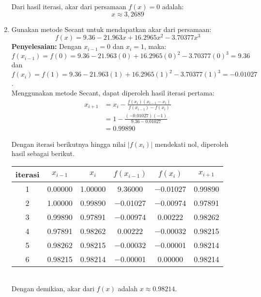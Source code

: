 \documentclass{article}
\newcommand{\penyelesaian}{\textbf{Penyelesaian: }}
\begin{document}
\begin{enumerate}
    Dari hasil iterasi, akar dari persamaan $f(x) = 0$ adalah:
    \begin{equation}
        x \approx 3,2689
    \end{equation}

    \item Gunakan metode Secant untuk mendapatkan akar dari persamaan:
    \begin{equation*}
        f(x) = \num{9,36} - \num{21,963}x + \num{16,2965}x^2 - \num{3,70377}x^3
    \end{equation*}
    \penyelesaian Dengan $x_{i-1} = 0$ dan $x_i = 1$, maka: \\
    $f(x_{i-1}) = f(0) = \num{9,36} - \num{21,963}(0) + \num{16,2965}(0)^2 - \num{3,70377}(0)^3 = \num{9,36}$ dan \\ 
    $f(x_{i}) = f(1) = \num{9,36} - \num{21,963}(1) + \num{16,2965}(1)^2 - \num{3,70377}(1)^3 = \num{-0,01027}$. \\

    Menggunakan metode Secant, dapat diperoleh hasil iterasi pertama:
    \begin{align*}
        x_{i+1} &= x_i - \frac{f(x_i)(x_{i-1} - x_i)}{f(x_{i-1}) - f(x_i)} \\
        &= 1 - \frac{(-\num{0,01027})(-1)}{\num{9,36} - \num{0,01027}} \\
        &= \num{0,99890}
    \end{align*}

    Dengan iterasi berikutnya hingga nilai $|f(x_i)|$ mendekati nol, diperoleh hasil sebagai berikut.\\
    \begin{tabular}{|c|c|c|c|c|c|}
        \hline
        iterasi & $x_{i-1}$ & $x_i$ & $f(x_{i-1})$ & $f(x_i)$ & $x_{i+1}$ \\
        \hline
        1 & \num{0,00000} & \num{1,00000} & \num{9,36000} & \num{-0,01027} & \num{0,99890}\\
        2 & \num{1,00000} & \num{0,99890} & \num{-0,01027} & \num{-0,00974} & \num{0,97891}\\
        3 & \num{0,99890} & \num{0,97891} & \num{-0,00974} & \num{0,00222} & \num{0,98262}\\
        4 & \num{0,97891} & \num{0,98262} & \num{0,00222} & \num{-0,00032} & \num{0,98215}\\
        5 & \num{0,98262} & \num{0,98215} & \num{-0,00032} & \num{-0,00001} & \num{0,98214}\\
        6 & \num{0,98215} & \num{0,98214} & \num{-0,00001} & \num{0,00000} & \num{0,98214}\\
         \hline
        \end{tabular} \\
    Dengan demikian, akar dari $f(x)$ adalah $x \approx \num{0,98214}$.


\end{enumerate}
\end{document}
